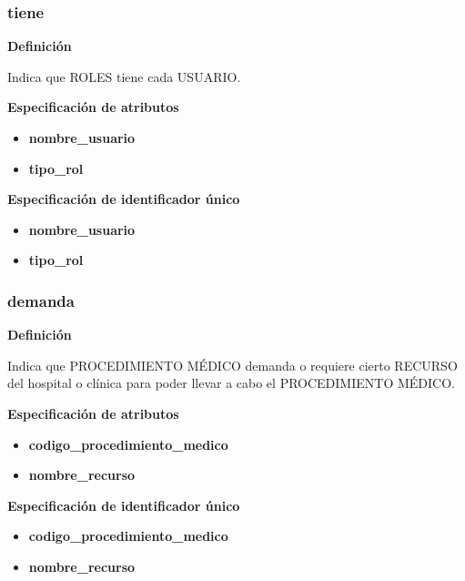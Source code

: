\documentclass[a4paper,11pt]{article}
\begin{document}
\subsubsection{\textbf{tiene}}

\textbf{Definición}

Indica que ROLES tiene cada USUARIO.

\textbf{Especificación de atributos}


\begin{itemize}

     \item \textbf{nombre\_usuario}

     \item \textbf{tipo\_rol}

\end{itemize}

\textbf{Especificación de identificador único}

\begin{itemize}

      \item \textbf{nombre\_usuario}

     \item \textbf{tipo\_rol}

\end{itemize}

\subsubsection{\textbf{demanda}}

\textbf{Definición}

Indica que PROCEDIMIENTO MÉDICO demanda o requiere cierto RECURSO del hospital o clínica
para poder llevar a cabo el PROCEDIMIENTO MÉDICO.

\textbf{Especificación de atributos}


\begin{itemize}
     \item \textbf{codigo\_procedimiento\_medico} 

     \item \textbf{nombre\_recurso}

\end{itemize}

\textbf{Especificación de identificador único}

\begin{itemize}

     \item \textbf{codigo\_procedimiento\_medico} 

     \item \textbf{nombre\_recurso}

\end{itemize}
\end{document}
